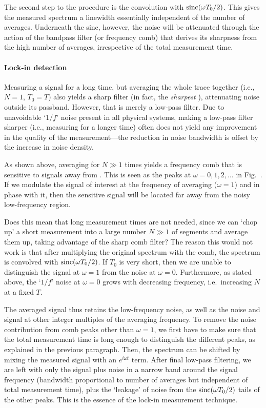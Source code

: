 The second step to the procedure is the convolution with $\operatorname{sinc}(\omega T_0/2)$.
This gives the measured spectrum a linewidth essentially independent of the
number of averages. Underneath the sinc, however, the noise will be attenuated
through the action of the bandpass filter (or frequency comb) that derives its
sharpness from the high number of averages, irrespective of the total
measurement time.

\paragraph{Lock-in detection}

Measuring a signal for a long time, but averaging the whole trace together
(i.e., $N=1$, $T_0=T$) also yields a sharp filter (in fact, the \emph{sharpest}
\cite[sect~7.5.1]{oppenheim2010discrete}), attenuating noise outside its
passband. However, that is merely a low-pass filter. Due to unavoidable `$1/f$'
noise present in all physical systems, making a low-pass filter sharper (i.e.,
measuring for a longer time) often does not yield any improvement in the quality
of the measurement---the reduction in noise bandwidth is offset by the increase
in noise density.

As shown above, averaging for $N\gg1$ times yields a frequency comb that is
sensitive to signals away from \DC. This is seen as the peaks at
$\omega=0,1,2,\ldots$ in Fig.~. If we modulate the signal of interest
at the frequency of averaging ($\omega=1$) and in phase with it, then the
sensitive signal will be located far away from the noisy low-frequency region.

Does this mean that long measurement times are not needed, since we can `chop
up' a short measurement into a large number $N\gg1$ of segments and average them
up, taking advantage of the sharp comb filter? The reason this would not work is
that after multiplying the original spectrum with the comb, the spectrum is
convolved with $\operatorname{sinc}(\omega T_0/2)$. If $T_0$ is very short, then we are unable
to distinguish the signal at $\omega=1$ from the noise at $\omega=0$. Furthermore,
as stated above, the `$1/f$' noise at $\omega=0$ grows with decreasing
frequency, i.e.\ increasing $N$ at a fixed $T$.

The averaged signal thus retains the low-frequency noise, as well as the noise
and signal at other integer multiples of the averaging frequency. To remove the
noise contribution from comb peaks other than $\omega=1$, we first have to make
sure that the total measurement time is long enough to distinguish the different
peaks, as explained in the previous paragraph. Then, the spectrum can be shifted
by mixing the measured signal with an $e^{i\omega t}$ term. After final low-pass
filtering, we are left with only the signal plus noise in a narrow band around
the signal frequency (bandwidth proportional to number of averages but
independent of total measurement time), plus the `leakage' of noise from the
$\operatorname{sinc}(\omega T_0/2)$ tails of the other peaks. This is the essence of the
lock-in measurement technique.

